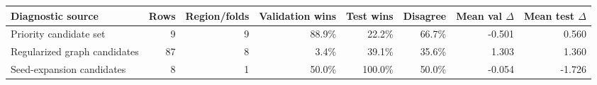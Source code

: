 \begin{tabular}{lrrrrrrr}
\toprule
Diagnostic source & Rows & Region/folds & Validation wins & Test wins & Disagree & Mean val $\Delta$ & Mean test $\Delta$ \\
\midrule
Priority candidate set & 9 & 9 & 88.9\% & 22.2\% & 66.7\% & -0.501 & 0.560 \\
Regularized graph candidates & 87 & 8 & 3.4\% & 39.1\% & 35.6\% & 1.303 & 1.360 \\
Seed-expansion candidates & 8 & 1 & 50.0\% & 100.0\% & 50.0\% & -0.054 & -1.726 \\
\bottomrule
\end{tabular}
